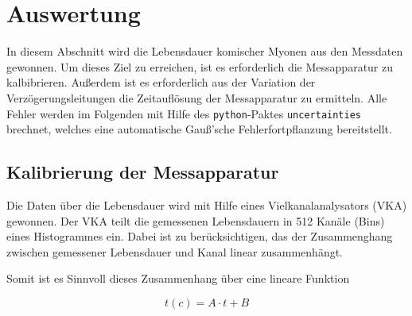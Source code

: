 \section{Auswertung}
\label{sec:evaluation}
In diesem Abschnitt wird die Lebensdauer komischer Myonen aus den Messdaten gewonnen.
Um dieses Ziel zu erreichen, ist es erforderlich die Messapparatur zu kalbibrieren. Außerdem
ist es erforderlich aus der Variation der Verzögerungsleitungen die 
Zeitauflösung der Messapparatur zu ermitteln. Alle Fehler werden im Folgenden mit Hilfe
des \texttt{python}-Paktes \texttt{uncertainties} brechnet, welches eine automatische
Gauß'sche Fehlerfortpflanzung bereitstellt.

\subsection{Kalibrierung der Messapparatur}
\label{sec:calibration}
Die Daten über die Lebensdauer wird mit Hilfe eines Vielkanalanalysators (VKA) gewonnen.
Der VKA teilt die gemessenen Lebensdauern in \num{512} Kanäle (Bins) eines Histogrammes ein.
Dabei ist zu berücksichtigen, das der Zusammenghang zwischen gemessener Lebensdauer und
Kanal linear zusammenhängt.

Somit ist es Sinnvoll dieses Zusammenhang über eine lineare Funktion

\begin{equation}
t(c) = A \cdot t + B
\end{equation} 
